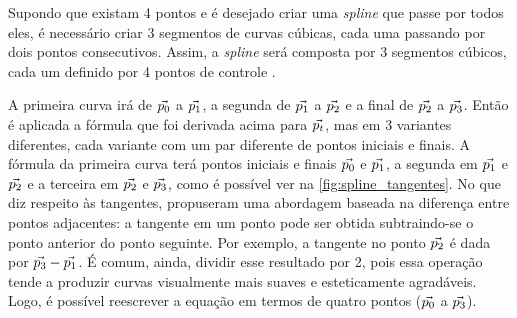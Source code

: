  Supondo que existam 4 pontos e é desejado criar uma \textit{spline} que passe por todos eles, é necessário criar 3 segmentos de curvas cúbicas, cada uma passando por dois pontos consecutivos. Assim, a \textit{spline} será composta por 3 segmentos cúbicos, cada um definido por 4 pontos de controle \cite{CatmullRom}.

 A primeira curva irá de ${\vec{p_0}}$ a ${\vec{p_1}}$, a segunda de ${\vec{p_1}}$ a ${\vec{p_2}}$ e a final de ${\vec{p_2}}$ a ${\vec{p_3}}$. Então é aplicada a fórmula que foi derivada acima para ${\vec{p_t}}$, mas em 3 variantes diferentes, cada variante com um par diferente de pontos iniciais e finais. A fórmula da primeira curva terá pontos iniciais e finais ${\vec{p_0}}$ e ${\vec{p_1}}$, a segunda em ${\vec{p_1}}$ e ${\vec{p_2}}$ e a terceira em ${\vec{p_2}}$ e ${\vec{p_3}}$, como é possível ver na \autoref{fig:spline_tangentes}. No que diz respeito às tangentes, \citet{CatmullRom} propuseram uma abordagem baseada na diferença entre pontos adjacentes: a tangente em um ponto pode ser obtida subtraindo-se o ponto anterior do ponto seguinte. Por exemplo, a tangente no ponto ${\vec{p_2}}$ é dada por ${\vec{p_3}} - {\vec{p_1}}$. É comum, ainda, dividir esse resultado por 2, pois essa operação tende a produzir curvas visualmente mais suaves e esteticamente agradáveis. Logo, é possível reescrever a equação em termos de quatro pontos (${\vec{p_0}}$ a ${\vec{p_3}}$).


